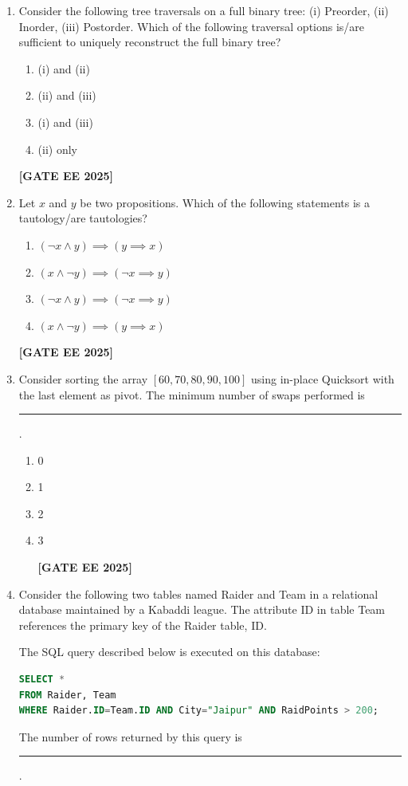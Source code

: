 \documentclass[journal]{IEEEtran}
\newcommand{\qfooter}{%
  \begin{flushright}\footnotesize\textbf{[GATE EE 2025]}\end{flushright}\vspace{1em}%
}
\begin{document}
\begin{enumerate}[leftmargin=*,label=\arabic*.]
\item Consider the following tree traversals on a full binary tree: (i) Preorder, (ii) Inorder, (iii) Postorder. Which of the following traversal options is/are sufficient to uniquely reconstruct the full binary tree?
\begin{multicols}{2}
\begin{enumerate}[label=(\Alph*)]
\item (i) and (ii)
\item (ii) and (iii)
\item (i) and (iii)
\item (ii) only
\end{enumerate} \qfooter
\end{multicols}

\item Let $x$ and $y$ be two propositions. Which of the following statements is a tautology/are tautologies?
\begin{multicols}{2}
\begin{enumerate}[label=(\Alph*)]
\item $(\neg x \land y) \implies (y \implies x)$
\item $(x\land \neg y) \implies (\neg x \implies y)$
\item $(\neg x \land y) \implies (\neg x \implies y)$
\item $(x\land \neg y) \implies (y \implies x)$
\end{enumerate} \qfooter
\end{multicols}

\item Consider sorting the array $[60, 70, 80, 90, 100]$ using in-place Quicksort with the last element as pivot. The minimum number of swaps performed is \rule{2cm}{0.15mm}.
\begin{enumerate}
\item 0
\item 1
\item 2
\item 3
\qfooter
\end{enumerate}


\item Consider the following two tables named Raider and Team in a relational database maintained by a Kabaddi league. The attribute ID in table Team references the primary key of the Raider table, ID.



The SQL query described below is executed on this database:
\begin{lstlisting}[language=SQL]
SELECT *
FROM Raider, Team
WHERE Raider.ID=Team.ID AND City="Jaipur" AND RaidPoints > 200;
\end{lstlisting}
The number of rows returned by this query is \rule{5em}{0.07em}.


\end{enumerate}
\end{document}
